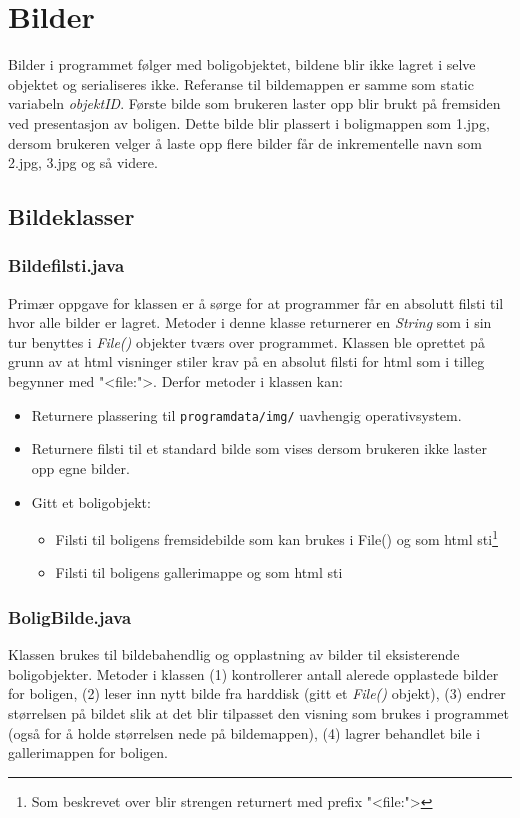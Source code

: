 \section{Bilder} \label{sec:bilder}
Bilder i programmet følger med boligobjektet, bildene blir ikke lagret i selve objektet og serialiseres ikke. Referanse til bildemappen er samme som static variabeln \emph{objektID}. Første bilde som brukeren laster opp blir brukt på fremsiden ved presentasjon av boligen. Dette bilde blir plassert i boligmappen som 1.jpg, dersom brukeren velger å laste opp flere bilder får de inkrementelle navn som 2.jpg, 3.jpg og så videre. 

\subsection{Bildeklasser}
\subsubsection*{Bildefilsti.java}
Primær oppgave for klassen er å sørge for at programmer får en absolutt filsti til hvor alle bilder er lagret. Metoder i denne klasse returnerer en \emph{String} som i sin tur benyttes i \emph{File()} objekter tværs over programmet.  
Klassen ble oprettet på grunn av at html visninger stiler krav på en absolut filsti for html som i tilleg begynner med "<file:">. Derfor metoder i klassen kan: 
\begin{itemize}[noitemsep,nolistsep]
\item Returnere plassering til \texttt{programdata/img/} uavhengig operativsystem.
\item Returnere filsti til et standard bilde som vises dersom brukeren ikke laster opp egne bilder.
\item Gitt et boligobjekt:
\begin{itemize}
\item Filsti til boligens fremsidebilde som kan brukes i File() og som html sti\footnote{Som beskrevet over blir strengen returnert med prefix "<file:">}
\item Filsti til boligens gallerimappe og som html sti
\end{itemize}
\end{itemize}

\subsubsection*{BoligBilde.java}
Klassen brukes til bildebahendlig og opplastning av bilder til eksisterende boligobjekter. Metoder i klassen (1) kontrollerer antall alerede opplastede bilder for boligen, (2) leser inn nytt bilde fra harddisk (gitt et \emph{File()} objekt), (3) endrer størrelsen på bildet slik at det blir tilpasset den visning som brukes i programmet (også for å holde størrelsen nede på bildemappen), (4) lagrer behandlet bile i gallerimappen for boligen.


